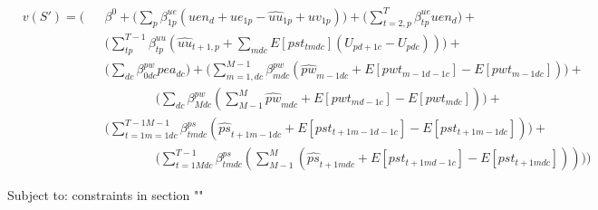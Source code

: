 \begin{equation}\begin{alignedat}{10}
		&	v(S') = \Bigg( 
		&& 	\beta^0 + 
		\bigg( \sum_{p} \beta_{1p}^{ue} 
		(uen_{d} + ue_{1p} - \hat{uu}_{1p} + uv_{1p}) \bigg)+
		\bigg( \sum_{t=2,p}^{T} \beta_{tp}^{ue} uen_{d} \bigg)+ \\
		&	&& 	\bigg( \sum_{tp}^{T-1} \beta_{tp}^{uu} 
		( \hat{uu}_{t+1,p} + \sum_{mdc} E[pst_{tmdc}] (U_{pd+1c} - U_{pdc})) \bigg) + \\
		&	&&	\bigg( \sum_{dc} \beta_{0dc}^{pw} pea_{dc} \bigg) +
		\bigg( \sum_{m=1,dc}^{M-1} \beta_{mdc}^{pw} 
		(\hat{pw}_{m-1dc} + E[pwt_{m-1d-1c}] - E[pwt_{m-1dc}]) \bigg) + \\
		&	&&	\qquad \qquad \bigg( \sum_{dc} \beta_{Mdc}^{pw} 
		(\sum_{M-1}^{M} \hat{pw}_{mdc} + E[pwt_{md-1c}] - E[pwt_{mdc}])\bigg) + \\
		& 	&&	\bigg( \sum_{t=1m=1dc}^{T-1M-1} \beta_{tmdc}^{ps} 
		(\hat{ps}_{t+1m-1dc} + E[pst_{t+1m-1d-1c}] - E[pst_{t+1m-1dc}]) \bigg) + \\	
		&	&&	\qquad \qquad \bigg( \sum_{t=1Mdc}^{T-1} \beta_{tmdc}^{ps} 
		(\sum_{M-1}^{M} (\hat{ps}_{t+1mdc} + E[pst_{t+1md-1c}] - E[pst_{t+1mdc}])) \bigg)
		\Bigg)
	\end{alignedat}
\end{equation}

Subject to:
constraints in section ""
